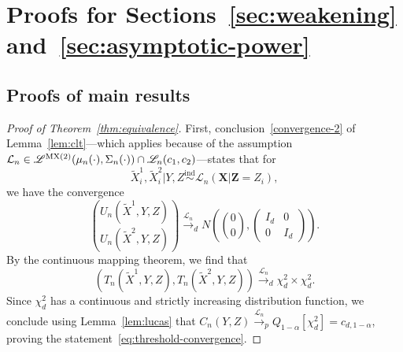 \documentclass[ejs]{imsart}
\numberwithin{equation}{section}
\theoremstyle{plain}
\theoremstyle{definition}
\theoremstyle{remark}
\newcommand{\prx}{\bm X}
\newcommand{\prz}{\bm Z}
\newcommand{\srz}{Z}
\newcommand{\srxk}{\widetilde X}
\newcommand{\sry}{Y}
\begin{document}
\clearpage


\section{Proofs for Sections~\ref{sec:weakening} and~\ref{sec:asymptotic-power}} \label{sec:proofs-sec45}

\subsection{Proofs of main results}

\begin{proof}[Proof of Theorem~\ref{thm:equivalence}]
	
	First, conclusion~\eqref{convergence-2} of Lemma~\ref{lem:clt}---which applies because of the assumption $\mathcal L_n \in \mathscr L^{\textnormal{MX(2)}}(\mu_n(\cdot), \Sigma_n(\cdot)) \cap \mathscr L_n(c_1, c_2)$---states that for 
	\[
	\srxk^1_i, \srxk^2_i|\sry,\srz \overset{\text{ind}}\sim {\mathcal L_n(\prx|\prz = \srz_i)}, 
	\]
	we have the convergence
	\begin{equation}
		{U_n(\srxk^1, \sry, \srz) \choose U_n(\srxk^2, \sry, \srz)} \overset{\mathcal L_n}\rightarrow_d N\left({0 \choose 0},
		\begin{pmatrix}
			I_d & 0 \\
			0 & I_d
		\end{pmatrix}
		\right).
	\end{equation}
	By the continuous mapping theorem, we find that 
	\begin{equation}
		(T_n(\srxk^1, \sry, \srz), T_n(\srxk^2, \sry, \srz)) \overset{\mathcal L_n}\rightarrow_d  \chi^2_d \times \chi^2_d. 
	\end{equation}
	Since $\chi^2_d$ has a continuous and strictly increasing distribution function, we conclude using Lemma~\ref{lem:lucas} that $C_n(\sry,\srz)  \overset{\mathcal L_n}\rightarrow_p Q_{1-\alpha}[\chi^2_d] =  c_{d,1-\alpha}$, proving the statement~\eqref{eq:threshold-convergence}.
	

\end{proof}
\end{document}
